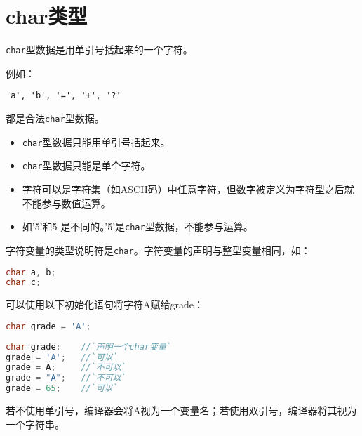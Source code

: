 \section{char类型}
\begin{frame}[fragile]\ft{\secname}
\begin{dingyi}
\lstinline|char|型数据是用单引号括起来的一个字符。
\end{dingyi}
例如：
\begin{lstlisting}
'a', 'b', '=', '+', '?'
\end{lstlisting}
都是合法\lstinline|char|型数据。
\end{frame}

\begin{frame}
\begin{itemize}
\item \lstinline|char|型数据只能用单引号括起来。\\[0.1in]
\item \lstinline|char|型数据只能是单个字符。\\[0.1in]
\item 字符可以是字符集（如ASCII码）中任意字符，但数字被定义为字符型之后就不能参与数值运算。\\[0.1in]
\item[] 如'5'和5 是不同的。'5'是\lstinline|char|型数据，不能参与运算。
\end{itemize}
\end{frame}

\begin{frame}[fragile]
字符变量的类型说明符是\lstinline|char|。字符变量的声明与整型变量相同，如：
\begin{lstlisting}[language=C]
char a, b;
char c;
\end{lstlisting}

\end{frame}

\begin{frame}[fragile]
可以使用以下初始化语句将字符A赋给grade：
\begin{lstlisting}[language=C]
char grade = 'A';
\end{lstlisting}

\end{frame}

\begin{frame}[fragile]

\begin{lstlisting}[language=C]
char grade;    //`声明一个char变量`
grade = 'A';   //`可以`
grade = A;     //`不可以`
grade = "A";   //`不可以`
grade = 65;    //`可以` 
\end{lstlisting}
若不使用单引号，编译器会将A视为一个变量名；若使用双引号，编译器将其视为一个字符串。
\end{frame}


